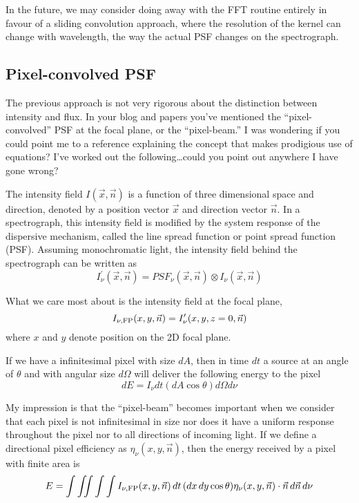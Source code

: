 \documentclass[preprint]{aastex} %
\begin{document}
In the future, we may consider doing away with the FFT routine entirely in favour of a sliding convolution approach, where the resolution of the kernel can change with wavelength, the way the actual PSF changes on the spectrograph.

\subsection{Pixel-convolved PSF}

The previous approach is not very rigorous about the distinction between intensity and flux. In your blog and papers you've mentioned the ``pixel-convolved'' PSF at the focal plane, or the ``pixel-beam.'' I was wondering if you could point me to a reference explaining the concept that makes prodigious use of equations? I've worked out the following\ldots could you point out anywhere I have gone wrong?

The intensity field $I(\vec{x}, \vec{n})$ is a function of three dimensional space and direction, denoted by a position vector $\vec{x}$ and direction vector $\vec{n}$.  In a spectrograph, this intensity field is modified by the system response of the dispersive mechanism, called the line spread function or point spread function (PSF). Assuming monochromatic light, the intensity field behind the spectrograph can be written as
\begin{equation}
  I^\prime_\nu(\vec{x}, \vec{n}) = PSF_\nu(\vec{x}, \vec{n}) \otimes I_\nu(\vec{x}, \vec{n})
\end{equation}

What we care most about is the intensity field at the focal plane, 
\begin{equation}
  I_{\nu, {\rm FP}}(x, y, \vec{n}) = I^\prime_\nu(x, y, z=0, \vec{n})
\end{equation}
where $x$ and $y$ denote position on the 2D focal plane.

If we have a infinitesimal pixel with size $dA$, then in time $dt$ a source at an angle of $\theta$ and with angular size $d\Omega$ will deliver the following energy to the pixel
\begin{equation}
  dE = I_\nu dt (dA \cos \theta) d\Omega d\nu
\end{equation}

My impression is that the ``pixel-beam'' becomes important when we consider that each pixel is not infinitesimal in size nor does it have a uniform response throughout the pixel nor to all directions of incoming light. If we define a directional pixel efficiency as $\eta_\nu(x, y, \vec{n})$, then the energy received by a pixel with finite area is
\begin{equation}
  E = \int \iint \int \int I_{\nu, {\rm FP}} (x, y, \vec{n})\, dt\, (dx\,dy \cos \theta) \eta_\nu(x, y, \vec{n}) \cdot \vec{n} \, d\vec{n}\, d\nu
\end{equation}
\end{document}
